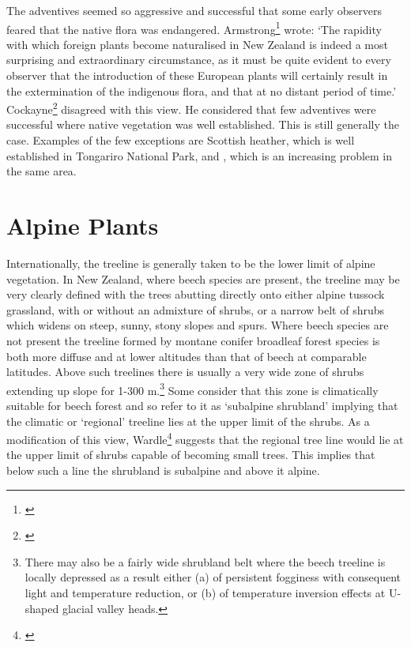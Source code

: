 The adventives seemed so aggressive and successful that some early observers feared that the native flora was endangered.
Armstrong\footnote{\cite{armstrong1872naturalised}} wrote: `The rapidity with which foreign plants become naturalised in New Zealand is indeed a most surprising and extraordinary circumstance, as it must be quite evident to every observer that the introduction of these European plants will certainly result in the extermination of the indigenous flora, and that at no distant period of time.' Cockayne\footnote{\cite{cockayne1967plants}} disagreed with this view.
He considered that few adventives were successful where native vegetation was well established.
This is still generally the case.
Examples of the few exceptions are Scottish heather, which is well established in Tongariro National Park, and , which is an increasing problem in the same area.

\chapter{Alpine Plants}

Internationally, the treeline is generally taken to be the lower limit of alpine vegetation.
In New Zealand, where beech species are present, the treeline may be very clearly defined with the trees abutting directly onto either alpine tussock grassland, with or without an admixture of shrubs, or a narrow belt of shrubs which widens on steep, sunny, stony slopes and spurs.
Where beech species are not present the treeline formed by montane conifer broadleaf forest species is both more diffuse and at lower altitudes than that of beech at comparable latitudes.
Above such treelines there is usually a very wide zone of shrubs extending up slope for 1-300 m.\footnote{There may also be a fairly wide shrubland belt where the beech treeline is locally depressed as a result either (a) of persistent fogginess with consequent light and temperature reduction, or (b) of temperature inversion effects at U-shaped glacial valley heads.}
Some consider that this zone is climatically suitable for beech forest and so refer to it as `subalpine shrubland' implying that the climatic or `regional' treeline lies at the upper limit of the shrubs.
As a modification of this view, Wardle\footnote{\cite{wardle1965comparison}} suggests that the regional tree line would lie at the upper limit of shrubs capable of becoming small trees.
This implies that below such a line the shrubland is subalpine and above it alpine.

